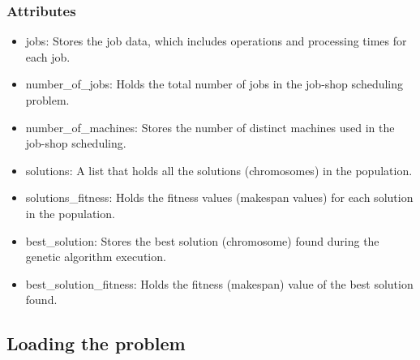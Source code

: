 \documentclass[11pt, a4paper]{article}
\begin{document}
\subsubsection{Attributes}

\begin{itemize}
    \item jobs: Stores the job data, which includes operations and processing times for each job.
    \item number\_of\_jobs: Holds the total number of jobs in the job-shop scheduling problem.
    \item number\_of\_machines: Stores the number of distinct machines used in the job-shop scheduling.
    \item solutions: A list that holds all the solutions (chromosomes) in the population.
    \item solutions\_fitness: Holds the fitness values (makespan values) for each solution in the population.
    \item best\_solution: Stores the best solution (chromosome) found during the genetic algorithm execution.
    \item best\_solution\_fitness: Holds the fitness (makespan) value of the best solution found.
\end{itemize}

\subsection{Loading the problem}
\end{document}
